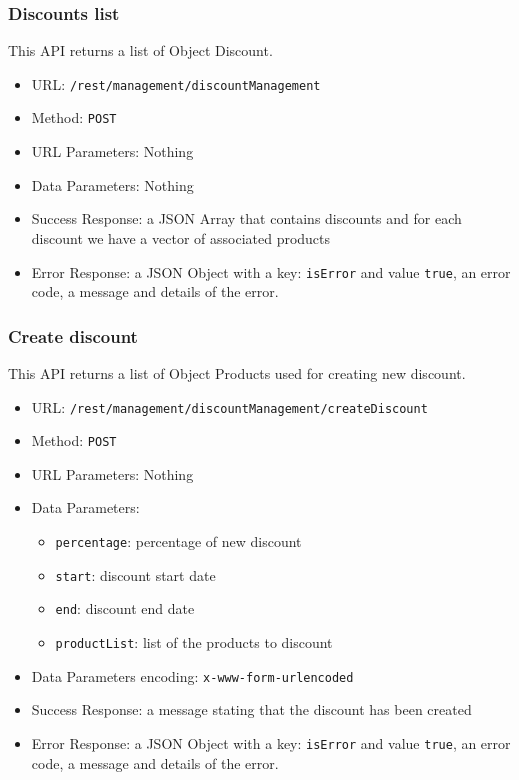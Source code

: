 \subsubsection*{Discounts list}
This API returns a list of Object Discount.

\begin{itemize}
    \item URL: \texttt{/rest/management/discountManagement}
    \item Method: \texttt{POST}
    \item URL Parameters: Nothing
    \item Data Parameters: Nothing
    \item Success Response: a JSON Array that contains discounts and for each discount we have a vector of associated products
    \item Error Response: a JSON Object with a key: \texttt{isError}  and value \texttt{true}, an error code, a message and details of the error.
\end{itemize}

\subsubsection*{Create discount}
This API returns a list of Object Products used for creating new discount.

\begin{itemize}
    \item URL: \texttt{/rest/management/discountManagement/createDiscount}
    \item Method: \texttt{POST}
    \item URL Parameters: Nothing
    \item Data Parameters: 
    \begin{itemize}
        \item \texttt{percentage}: percentage of new discount
        \item \texttt{start}: discount start date
        \item \texttt{end}: discount end date
        \item \texttt{productList}: list of the products to discount
    \end{itemize}
    \item Data Parameters encoding: \texttt{x-www-form-urlencoded}
    \item Success Response: a message stating that the discount has been created
    \item Error Response: a JSON Object with a key: \texttt{isError}  and value \texttt{true}, an error code, a message and details of the error.
\end{itemize}

